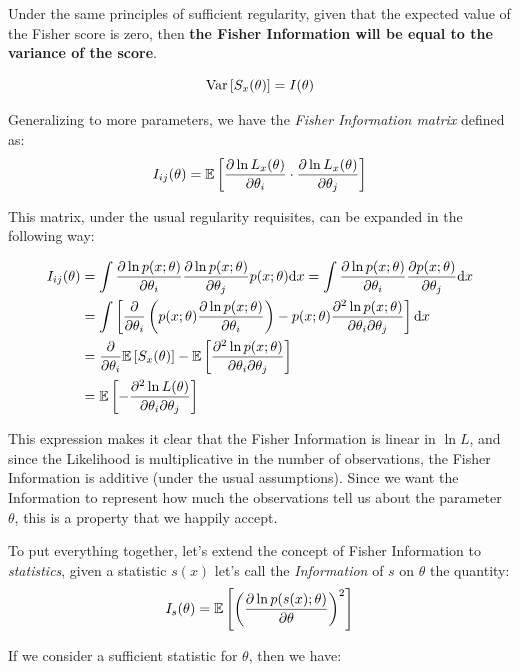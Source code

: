 Under the same principles of sufficient regularity, given that the expected value of the Fisher score is zero, then \textbf{the Fisher Information will be equal to the variance of the score}. 

	\[
	\operatorname{Var}\left[S_x(\theta)\right] = I(\theta)
	\]

Generalizing to more parameters, we have the \emph{Fisher Information matrix} defined as:
	\[
	I_{ij}(\theta) = \mathbb{E}\left[ \frac{\partial \ln L_x(\theta)}{\partial \theta_i}\cdot \frac{\partial \ln L_x(\theta)}{\partial \theta_j}\right]
	\]

This matrix, under the usual regularity requisites, can be expanded in the following way:

\begin{align*}
	I_{ij}(\theta) &= \int \frac{\partial \ln p(x;\theta)}{\partial \theta_i} \frac{\partial \ln p(x;\theta)}{\partial \theta_j} p(x;\theta)\mathrm{d} x = \int \frac{\partial \ln p(x;\theta)}{\partial \theta_i} \frac{\partial p(x;\theta)}{\partial \theta_j} \mathrm{d} x \\
	&= \int\left[ \frac{\partial}{\partial\theta_i}\left(p(x;\theta)\frac{\partial \ln p(x;\theta)}{\partial \theta_i}\right) - p(x;\theta)\frac{\partial^2\ln p(x;\theta)}{\partial \theta_i \partial\theta_j}\right]\mathrm{d} x \\
	&= \frac{\partial}{\partial \theta_i}\mathbb{E}\left[S_x(\theta)\right] - \mathbb{E}\left[\frac{\partial^2 \ln p(x;\theta)}{\partial \theta_i\partial\theta_j}\right] \\ 
	&= \mathbb{E}\left[-\frac{\partial^2\ln L(\theta)}{\partial\theta_i\partial\theta_j}\right]
\end{align*}

This expression makes it clear that the Fisher Information is linear in $\ln L$, and since the Likelihood is multiplicative in the number of observations, the Fisher Information is additive (under the usual assumptions). Since we want the Information to represent how much the observations tell us about the parameter $\theta$, this is a property that we happily accept. 

To put everything together, let's extend the concept of Fisher Information to \emph{statistics}, given a statistic $s(x)$ let's call the \emph{Information} of $s$ on $\theta$ the quantity:
	\[
	I_s(\theta) = \mathbb{E} \left[\left( \frac{\partial\ln p(s(x);\theta)}{\partial \theta}\right)^2 \right] 
	\]
	
If we consider a sufficient statistic for $\theta$, then we have:

